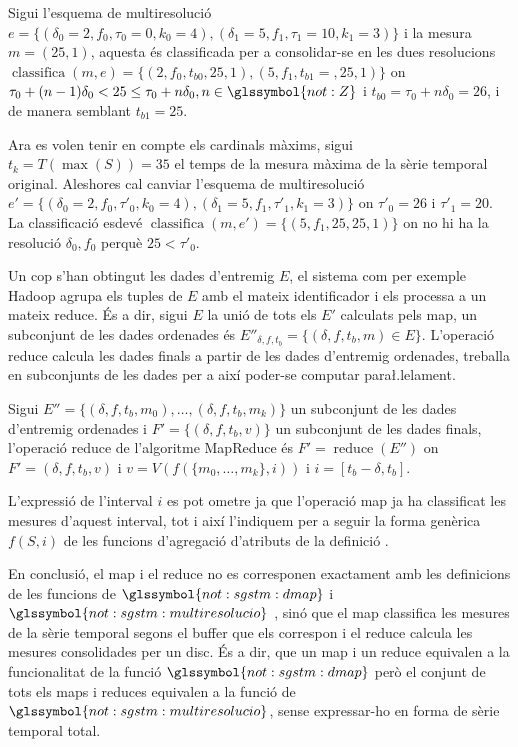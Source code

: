 \begin{example}
  Sigui l'esquema de multiresolució
  $e=\{(\delta_0=2,f_0,\tau_0=0,k_0=4),(\delta_1=5,f_1,\tau_1=10,k_1=3)\}$
  i la mesura $m=(25,1)$, aquesta és classificada per a consolidar-se
  en les dues resolucions $\operatorname{classifica}(m,e)=\{
  (2,f_0,t_{b0},25,1), (5,f_1,t_{b1}=,25,1) \}$ on
  $\tau_0+(n-1)\delta_0 < 25 \leq \tau_0+n\delta_0,
  n\in\glssymbol{not:Z}$ i $t_{b0}=\tau_0+n\delta_0 = 26$, i de manera
  semblant $t_{b1}= 25$.

  Ara es volen tenir en compte els cardinals màxims, sigui
  $t_k=T(\max(S))=35$ el temps de la mesura màxima de la sèrie
  temporal original. Aleshores cal canviar l'esquema de multiresolució
  $e'=\{(\delta_0=2,f_0,\tau'_0,k_0=4),(\delta_1=5,f_1,\tau'_1,k_1=3)\}$
  on $\tau'_0=26$ i $\tau'_1=20$. La classificació esdevé
  $\operatorname{classifica}(m,e')=\{ (5,f_1,25,25,1) \}$ on no hi ha
  la resolució $\delta_0,f_0$ perquè $25< \tau'_0$.
\end{example}





Un cop s'han obtingut les dades d'entremig $E$, el sistema com per
exemple Hadoop agrupa els tuples de $E$ amb el mateix identificador i
els processa a un mateix reduce. És a dir, sigui $E$ la unió de tots
els $E'$ calculats pels map, un subconjunt de les dades ordenades és
$E''_{\delta,f,t_b} = \{ (\delta,f,t_b,m) \in E \}$.  L'operació
reduce calcula les dades finals a partir de les dades d'entremig
ordenades, treballa en subconjunts de les dades per a així poder-se
computar para\l.lelament.
\begin{definition}
  Sigui $E''= \{ (\delta,f,t_b,m_0) ,\dotsc, (\delta,f,t_b,m_k) \}$ un
  subconjunt de les dades d'entremig ordenades i $F'=\{
  (\delta,f,t_b,v) \}$ un subconjunt de les dades finals, l'operació
  reduce de l'algoritme MapReduce és $F'=\operatorname{reduce}(E'')$
  on $F'= (\delta,f,t_b,v)$ i $v= V( f(\{m_0,\dotsc,m_k\},i))$ i
  $i=[t_b-\delta,t_b]$.

  L'expressió de l'interval $i$ es pot ometre ja que l'operació map ja
  ha classificat les mesures d'aquest interval, tot i així l'indiquem
  per a seguir la forma genèrica $f(S,i)$ de les funcions d'agregació
  d'atributs de la definició .
\end{definition}



En conclusió, el map i el reduce no es corresponen exactament
amb les definicions de les funcions de $\glssymbol{not:sgstm:dmap}$ i
$\glssymbol{not:sgstm:multiresolucio}$ , sinó
que el map classifica les mesures de la sèrie temporal segons el
buffer que els correspon i el reduce calcula les mesures consolidades
per un disc. És a dir, que un map i un reduce equivalen a la
funcionalitat de la funció $\glssymbol{not:sgstm:dmap}$ però el
conjunt de tots els maps i reduces equivalen a la funció de
$\glssymbol{not:sgstm:multiresolucio}$, sense expressar-ho en forma de
sèrie temporal total.








